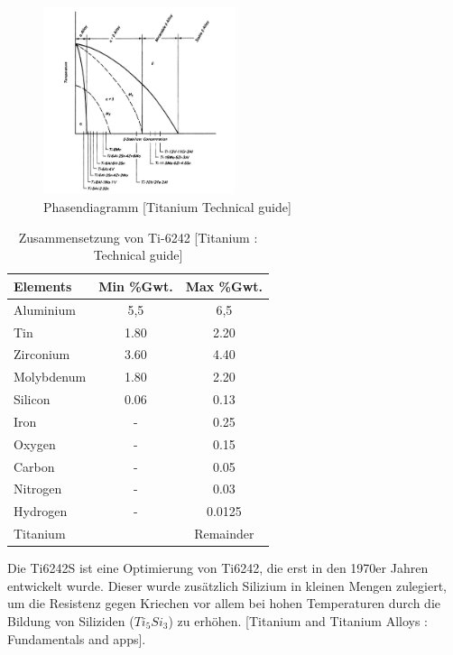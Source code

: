 \begin{figure}[H]
	\centering
	\includegraphics[width=0.5\textwidth]{Bilder/Phasendiagram}
	\caption{Phasendiagramm [Titanium Technical guide]}
	\label{PD-Ti6242}
\end{figure}





\begin{table}[H]
	
	\centering	
	\begin{tabular}{|l |c |c|}
		\hline
		\centering
		\hspace{20ex}Elements \hspace{20ex} & Min \%Gwt. & Max \%Gwt.\\
		\hline
		Aluminium&5,5&6,5\\
		Tin&1.80&2.20\\
		Zirconium&3.60&4.40\\
		Molybdenum&1.80&2.20\\
		Silicon &0.06&0.13\\
		Iron&-&0.25\\
		Oxygen&-&0.15\\
		Carbon&	-&	0.05\\
		Nitrogen&-&0.03\\
		Hydrogen&-&0.0125\\
		
		Titanium &&Remainder\\
		\hline
	\end{tabular}
	\caption{Zusammensetzung von Ti-6242 [Titanium : Technical guide]}
\end{table}


Die Ti6242S ist eine Optimierung von Ti6242, die erst in den 1970er Jahren  entwickelt wurde. Dieser wurde zusätzlich Silizium in kleinen Mengen zulegiert, um die Resistenz gegen Kriechen vor allem bei hohen Temperaturen durch die Bildung von Siliziden ($Ti_5Si_3$) zu erhöhen.  [Titanium and Titanium Alloys : Fundamentals and apps]. 

